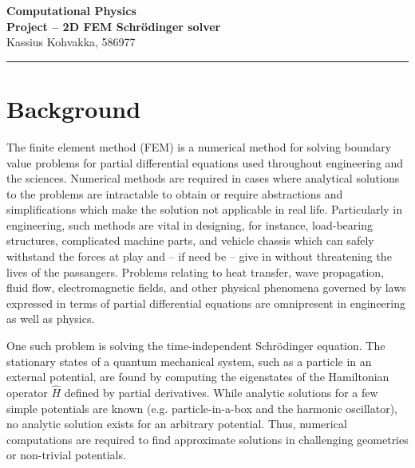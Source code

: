 \documentclass[a4paper,12pt]{article}
\newcommand{\exerline}{
\vspace*{.1cm}
\noindent \rule{\textwidth}{1pt}
\vspace*{.1cm}
}
\begin{document}
\begin{minipage}[t][1.5cm][b]{\textwidth}
\begin{center}
\Large{\textbf{Computational Physics}} \\
\vspace*{.1cm}
\Large{\textbf{Project -- 2D FEM Schrödinger solver}}\\
\vspace*{.1cm}
\large{Kassius Kohvakka, 586977}
\end{center}
\end{minipage} 
\vspace{-0.4cm}

\exerline
\vspace{-0.7cm}
\section{Background}

The finite element method (FEM) is a numerical method for solving boundary value problems for partial differential equations used throughout engineering and the sciences. Numerical methods are required in cases where analytical solutions to the problems are intractable to obtain or require abstractions and simplifications which make the solution not applicable in real life. Particularly in engineering, such methods are vital in designing, for instance, load-bearing structures, complicated machine parts, and vehicle chassis which can safely withstand the forces at play and -- if need be -- give in without threatening the lives of the passangers. Problems relating to heat transfer, wave propagation, fluid flow, electromagnetic fields, and other physical phenomena governed by laws expressed in terms of partial differential equations are omnipresent in engineering as well as physics. \cite{rao}

One such problem is solving the time-independent Schrödinger equation. The stationary states of a quantum mechanical system, such as a particle in an external potential, are found by computing the eigenstates of the Hamiltonian operator $\hat{H}$ defined by partial derivatives. While analytic solutions for a few simple potentials are known (e.g. particle-in-a-box and the harmonic oscillator), no analytic solution exists for an arbitrary potential. Thus, numerical computations are required to find approximate solutions in challenging geometries or non-trivial potentials.
\end{document}
